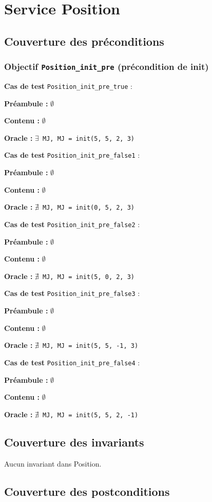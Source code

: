 \documentclass{article}
\newcommand{\cmd}[1]{\texttt{#1}}
\newcommand{\lEXISTS}{$\exists$}
\newcommand{\lNEXISTS}{$\nexists{}$}
\newcommand{\obj}[2]{\subsubsection*{\large{\textbf{Objectif {\cmd{#1} (#2)}}}}}
\newenvironment{cas}[1]
{
	\hspace{1em}\textbf{Cas de test} \cmd{#1} :
	\begin{list}{}{}
}{
	\end{list}\vspace{1em}
}
\newcommand{\npre}{\item \textbf{Préambule :} $\emptyset$}
\newcommand{\nope}{\item \textbf{Contenu :} $\emptyset$}
\newcommand{\ora}[1]{\item \textbf{Oracle :} \cmd{#1}}
\begin{document}
\clearpage{}





















\section{Service Position}

\subsection*{Couverture des préconditions}

\obj{Position\_init\_pre} {précondition de init}

	\begin{cas}{Position\_init\_pre\_true}
		\npre{}
		\nope{}
		\ora{\lEXISTS{} MJ, MJ = init(5, 5, 2, 3)}
	\end{cas}

	\begin{cas}{Position\_init\_pre\_false1}
		\npre{}
		\nope{}
		\ora{\lNEXISTS{} MJ, MJ = init(0, 5, 2, 3)}
	\end{cas}

	\begin{cas}{Position\_init\_pre\_false2}
		\npre{}
		\nope{}
		\ora{\lNEXISTS{} MJ, MJ = init(5, 0, 2, 3)}
	\end{cas}

	\begin{cas}{Position\_init\_pre\_false3}
		\npre{}
		\nope{}
		\ora{\lNEXISTS{} MJ, MJ = init(5, 5, -1, 3)}
	\end{cas}

	\begin{cas}{Position\_init\_pre\_false4}
		\npre{}
		\nope{}
		\ora{\lNEXISTS{} MJ, MJ = init(5, 5, 2, -1)}
	\end{cas}


\subsection*{Couverture des invariants}

Aucun invariant dans Position.

\subsection*{Couverture des postconditions}
\end{document}
